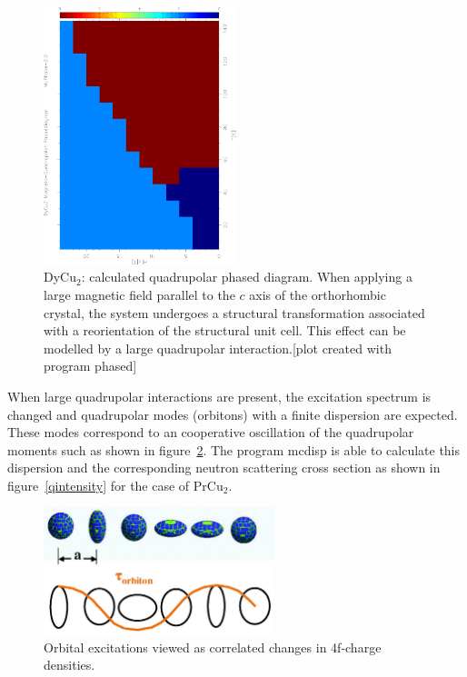 \begin{figure}[hb]%
\begin{center}\leavevmode
\includegraphics[angle=-90, width=0.5\textwidth]{figsrc/dyphased.ps}
\end{center}
\caption{DyCu$_2$: calculated quadrupolar phased diagram. When applying a large magnetic field
parallel to the $c$ axis of the orthorhombic crystal, the system undergoes a structural transformation
associated with a reorientation of the structural unit cell. This effect can be modelled by a large
quadrupolar interaction.[plot created with program {\prg phased}]}
\label{qphased}
\end{figure}

When large  quadrupolar interactions are present, the excitation spectrum is changed and
quadrupolar modes (orbitons) with a finite dispersion are expected. 
These modes correspond to an cooperative oscillation of the quadrupolar moments such as shown
in figure~\ref{qmodes}.
The program {\prg mcdisp}
is able to calculate this dispersion and the corresponding neutron scattering cross section as shown
in figure~\ref{qintensity} for the case of PrCu$_2$. 
 

\begin{figure}[hb]%
\begin{center}\leavevmode
\includegraphics[angle=0, width=0.6\textwidth]{figsrc/orbiton.ps}
\end{center}
\caption{Orbital excitations viewed  as correlated changes in 4f-charge densities.}
\label{qmodes}
\end{figure}

